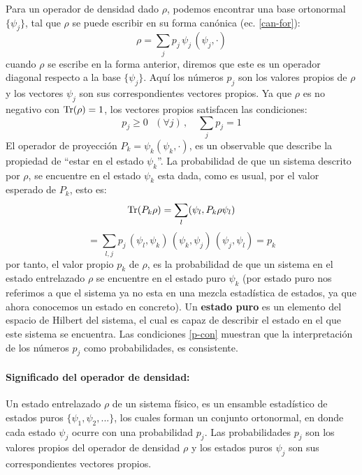 \documentclass[12pt]{book}
\numberwithin{equation}{chapter}
\def\Tr{\hbox{Tr}}
\begin{document}
Para un operador de densidad dado $\rho$, podemos encontrar una base ortonormal $\{ \psi_{j} \}$, tal que $\rho$ se puede escribir en su forma can\'onica (ec. \eqref{can-for}): 
\begin{equation}\label{r-can}
\rho= \sum_{j} p_{j}\, \psi_{j}\, (\psi_{j}, \cdot)
\end{equation}
cuando $\rho$ se escribe en la forma anterior, diremos que este es un operador diagonal respecto a la base $\{ \psi_{j} \}$. Aqu\'i los n\'umeros $p_{j}$ son los valores propios de $\rho$ y los vectores $\psi_{j}$ son sus correspondientes vectores propios. Ya que $\rho$ es no negativo con $\Tr (\rho)=1$, los vectores propios satisfacen las condiciones:
\begin{equation}\label{p-con}
p_{j} \geq 0 \,\,\,\, (\forall j) \,,\,\,\,\,\,\, \sum_{j} p_{j}=1
\end{equation}
El operador de proyecci\'on $P_{k} = \psi_{k} ( \psi_{k}, \cdot )$, es un observable que describe la propiedad de ``estar en el estado $\psi_{k}$''. La probabilidad de que un sistema descrito por $\rho$, se encuentre en el estado $\psi_{k}$ esta dada, como es usual, por el valor esperado de $P_{k}$, esto es:
$$ \Tr (P_{k}\rho)= \sum_{l} ( \psi_{l},P_{k}\rho \psi_{l} ) $$  
\begin{equation}
= \sum_{l,j} p_{j}\, ( \psi_{l},\psi_{k} )\, ( \psi_{k},\psi_{j} )\, (\psi_{j},\psi_{l})=p_{k}
\end{equation}
por tanto, el valor propio $p_{k}$ de $\rho$, es la probabilidad de que un sistema en el estado entrelazado $\rho$ se encuentre en el estado puro $\psi_{k}$ (por estado puro nos referimos a que el sistema ya no esta en una mezcla estad\'istica de estados, ya que ahora conocemos un estado en concreto). Un {\bf estado puro} es un elemento del espacio de Hilbert del sistema, el cual es capaz de describir el estado en el que este sistema se encuentra. Las condiciones \eqref{p-con} muestran que la interpretaci\'on de los n\'umeros $p_{j}$ como probabilidades, es consistente.

\paragraph{Significado del operador de densidad:}
Un estado entrelazado $\rho$ de un sistema f\'isico, es un ensamble estad\'istico de estados puros $\{ \psi_{1},\psi_{2},... \}$, los cuales forman un conjunto ortonormal, en donde cada estado $\psi_{j}$ ocurre con una probabilidad $p_{j}$. Las probabilidades $p_{j}$ son los valores propios del operador de densidad $\rho$ y los estados puros $\psi_{j}$ son sus correspondientes vectores propios.
 
\end{document}

